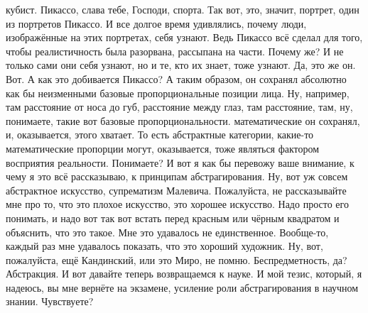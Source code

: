кубист. Пикассо, слава тебе, Господи, спорта. Так вот, это, значит, портрет,
один из портретов Пикассо. И все долгое время удивлялись, почему люди,
изображённые на этих портретах, себя узнают. Ведь Пикассо всё сделал для того,
чтобы реалистичность была разорвана, рассыпана на части. Почему же? И не только
сами они себя узнают, но и те, кто их знает, тоже узнают. Да, это же он. Вот. А
как это добивается Пикассо? А таким образом, он сохранял абсолютно как бы
неизменными базовые пропорциональные позиции лица. Ну, например, там расстояние
от носа до губ, расстояние между глаз, там расстояние, там, ну, понимаете, такие
вот базовые пропорциональности. математические он сохранял, и, оказывается,
этого хватает. То есть абстрактные категории, какие-то математические пропорции
могут, оказывается, тоже являться фактором восприятия реальности. Понимаете? И
вот я как бы перевожу ваше внимание, к чему я это всё рассказываю, к принципам
абстрагирования. Ну, вот уж совсем абстрактное искусство, супрематизм Малевича.
Пожалуйста, не рассказывайте мне про то, что это плохое искусство, это хорошее
искусство. Надо просто его понимать, и надо вот так вот встать перед красным или
чёрным квадратом и объяснить, что это такое. Мне это удавалось не единственное.
Вообще-то, каждый раз мне удавалось показать, что это хороший художник. Ну, вот,
пожалуйста, ещё Кандинский, или это Миро, не помню. Беспредметность, да?
Абстракция. И вот давайте теперь возвращаемся к науке. И мой тезис, который, я
надеюсь, вы мне вернёте на экзамене, усиление роли абстрагирования в научном
знании. Чувствуете? 

